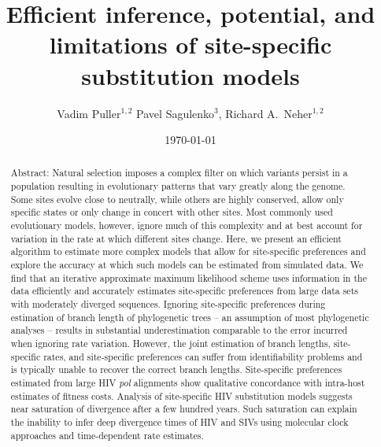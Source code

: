 \documentclass[aps,rmp,twocolumn,linenumbers]{revtex4-1}
\begin{document}
\title{Efficient inference, potential, and limitations of site-specific substitution models}
\author{Vadim Puller$^{1,2}$ Pavel Sagulenko$^{3}$, Richard A.~Neher$^{1,2}$}

\date{\today}

\begin{abstract}
Abstract: Natural selection imposes a complex filter on which variants persist in a population resulting in evolutionary patterns that vary greatly along the genome.
Some sites evolve close to neutrally, while others are highly conserved, allow only specific states or only change in concert with other sites.
Most commonly used evolutionary models, however, ignore much of this complexity and at best account for variation in the rate at which different sites change.
Here, we present an efficient algorithm to estimate more complex models that allow for site-specific preferences and explore the accuracy at which such models can be estimated from simulated data.
We find that an iterative approximate maximum likelihood scheme uses information in the data efficiently and accurately estimates site-specific preferences from large data sets with moderately diverged sequences.
Ignoring site-specific preferences during estimation of branch length of phylogenetic trees -- an assumption of most phylogenetic analyses -- results in substantial underestimation comparable to the error incurred when ignoring rate variation.
However, the joint estimation of branch lengths, site-specific rates, and site-specific preferences can suffer from identifiability problems and is typically unable to recover the correct branch lengths.
Site-specific preferences estimated from large HIV \emph{pol} alignments show qualitative concordance with intra-host estimates of fitness costs.
Analysis of site-specific HIV substitution models suggests near saturation of divergence after a few hundred years.
Such saturation can explain the inability to infer deep divergence times of HIV and SIVs using molecular clock approaches and time-dependent rate estimates.
\end{abstract}

\maketitle
\end{document}
